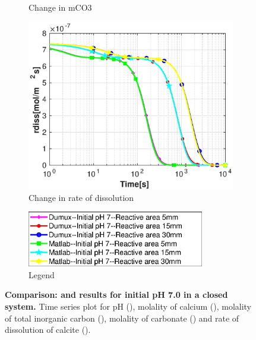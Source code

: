 \begin{figure}
\begin{subfigure}{.5\linewidth}
        \caption{\small Change in mCO3}
        \label{fig:dvmpH7mCO3}
    \end{subfigure}%
    \hfill
    \begin{subfigure}{.5\linewidth}
            \centering
        \includegraphics[width=\textwidth]{PICTURES/dvm_pH7_rdiss.eps}
        \caption{\small Change in rate of dissolution}
        \label{fig:dvmpH7rdiss}
    \end{subfigure}%
   \hfill
   \begin{subfigure}{.5\linewidth}
            \centering
        \includegraphics[width=0.85\textwidth]{PICTURES/dvm_pH7_legend.eps}
        \caption{\small Legend}
        \label{fig:dvmpH7legend}
    \end{subfigure}%
   \caption [Comparison: \DuMuX and \MATLAB results for initial pH 7.0 in a closed system.] {\textbf{Comparison: \DuMuX and \MATLAB 
   results for initial pH 7.0 in a closed system.} \small Time series plot for pH (), 
   molality of calcium (), molality of total inorganic carbon (), 
   molality of carbonate () and rate of dissolution of calcite ().} 
    \label{fig:comparisionDumuxMatlab_pH7.0}
\end{figure}


